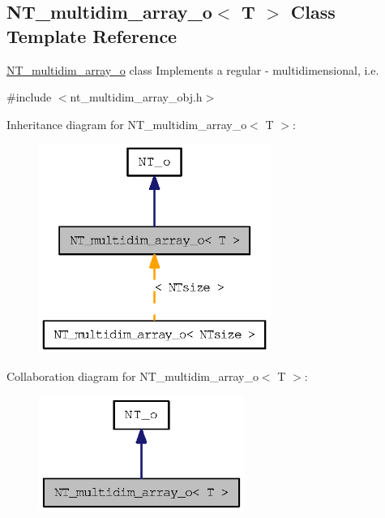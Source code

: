 \subsection{NT\_\-multidim\_\-array\_\-o$<$ T $>$ Class Template Reference}
\label{class_n_t__multidim__array__o}


\hyperlink{class_n_t__multidim__array__o}{NT\_\-multidim\_\-array\_\-o} class Implements a regular -\/ multidimensional, i.e.  




{\ttfamily \#include $<$nt\_\-multidim\_\-array\_\-obj.h$>$}



Inheritance diagram for NT\_\-multidim\_\-array\_\-o$<$ T $>$:
\nopagebreak
\begin{figure}[H]
\begin{center}
\leavevmode
\includegraphics[width=214pt]{class_n_t__multidim__array__o__inherit__graph}
\end{center}
\end{figure}


Collaboration diagram for NT\_\-multidim\_\-array\_\-o$<$ T $>$:
\nopagebreak
\begin{figure}[H]
\begin{center}
\leavevmode
\includegraphics[width=190pt]{class_n_t__multidim__array__o__coll__graph}
\end{center}
\end{figure}
